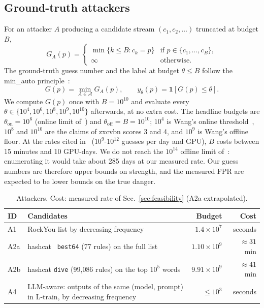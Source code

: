 \documentclass[conference]{IEEEtran}
\begin{document}
\subsection{Ground-truth attackers}
For an attacker $A$ producing a candidate stream $(c_1,c_2,\dots)$ truncated at budget $B$,
\begin{equation}\label{eq:gn}
G_A(p)=\begin{cases}\min\{k\le B : c_k=p\} & \text{if } p\in\{c_1,\dots,c_B\},\\ \infty & \text{otherwise.}\end{cases}
\end{equation}
The ground-truth guess number and the label at budget $\theta\le B$ follow the min\_auto principle~\cite{ur2015}:
\begin{equation}\label{eq:gt}
G(p)=\min_{A\in\mathcal A}G_A(p),\qquad y_\theta(p)=\mathbf 1\!\left[G(p)\le\theta\right].
\end{equation}
We compute $G(p)$ once with $B=10^{10}$ and evaluate every $\theta\in\{10^4,10^6,10^8,10^9,10^{10}\}$ afterwards, at no extra cost. The headline budgets are $\theta_{\text{on}}=10^6$ (online limit of~\cite{florencio2016,tan2020}) and $\theta_{\text{off}}=B=10^{10}$; $10^4$ is Wang's online threshold~\cite{wang2023}, $10^8$ and $10^{10}$ are the claims of zxcvbn scores 3 and 4, and $10^9$ is Wang's offline floor. At the rates cited in~\cite{golla2018} ($10^9$-$10^{12}$ guesses per day and GPU), $B$ costs between 15 minutes and 10 GPU-days. We do not reach the $10^{14}$ offline limit of~\cite{florencio2016,tan2020}: enumerating it would take about 285 days at our measured rate. Our guess numbers are therefore upper bounds on strength, and the measured FPR are expected to be lower bounds on the true danger.

\begin{table}[t]
\centering
\caption{Attackers. Cost: measured rate of Sec.~\ref{sec:feasibility} (A2a extrapolated).}
\label{tab:att}
\footnotesize
\renewcommand{\arraystretch}{1.12}
\begin{tabularx}{\columnwidth}{@{}l Y r r@{}}
\toprule
\textbf{ID} & \textbf{Candidates} & \textbf{Budget} & \textbf{Cost}\\
\midrule
A1 & RockYou list by decreasing frequency & $1.4{\times}10^{7}$ & seconds\\
A2a & hashcat~\cite{hashcat} \texttt{best64} (77 rules) on the full list & $1.10{\times}10^{9}$ & $\approx31$ min\\
A2b & hashcat \texttt{dive} (99{,}086 rules) on the top $10^5$ words & $9.91{\times}10^{9}$ & $\approx41$ min\\
A4 & LLM-aware: outputs of the same (model, prompt) in L-train, by decreasing frequency & $\le10^3$ & seconds\\
\bottomrule
\end{tabularx}
\end{table}
\end{document}
